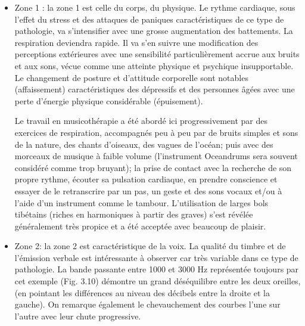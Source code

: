 \begin{itemize}
	\item Zone 1 :  la zone 1 est celle du corps, du physique. Le rythme cardiaque, sous l'effet du stress et 
	des 
	attaques de paniques caractéristiques de ce type de pathologie, va s'intensifier avec une grosse  
	augmentation des
	battements. La respiration deviendra
	rapide. Il va s'en suivre une modification des perceptions
	extérieures avec une sensibilité particulièrement accrue aux bruits et
	aux sons, vécue comme une
	atteinte physique et psychique insupportable.
	Le changement de posture et d'attitude corporelle sont
	notables (affaissement) caractéristiques des dépressifs et  
	des personnes âgées avec une perte d'énergie physique considérable (épuisement).
	
	Le travail en musicothérapie a été abordé ici  progressivement par des exercices de respiration, 
	accompagnés peu à peu par de bruits simples et sons de la nature, des chants d'oiseaux, des vagues 
	de l'océan; puis avec des morceaux de musique à faible 
	volume (l'instrument Oceandrums sera souvent considéré comme trop bruyant);  la prise de contact 
	avec la recherche de son propre rythme, écouter sa  pulsation cardiaque, en prendre 
	conscience et essayer de le retranscrire par un pas, un geste et des sons vocaux et/ou à l'aide d'un 
	instrument 
	comme le tambour. 
	 L'utilisation de larges bols tibétains (riches en harmoniques à partir des graves) s'est révélée 
	 généralement très propice 
	et a été acceptée avec beaucoup de plaisir.
	
	
	\item Zone 2: la zone 2 est caractéristique de la voix. 
	La qualité du timbre et de l'émission verbale est intéressante à observer car très variable dans ce type 
	de pathologie. La bande passante entre 1000 et 3000 Hz représentée  toujours par cet 
	exemple  (Fig. 3.10) démontre  un 
	grand déséquilibre entre les deux oreilles, (en pointant 
	les différences au niveau des décibels entre la droite et la gauche). On remarque également  le 
	chevauchement des courbes l'une sur l'autre avec leur chute progressive. 
	

\end{itemize}

